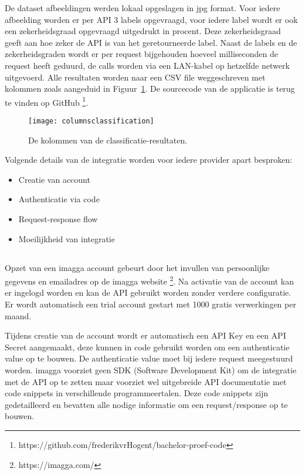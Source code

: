 De dataset afbeeldingen werden lokaal opgeslagen in jpg format. Voor iedere afbeelding worden er per API 3 labels opgevraagd, voor iedere label wordt er ook een zekerheidsgraad opgevraagd uitgedrukt in procent. Deze zekerheidsgraad geeft aan hoe zeker de API is van het geretourneerde label. Naast de labels en de zekerheidsgraden wordt er per request bijgehouden hoeveel milliseconden de request heeft geduurd, de calls worden via een LAN-kabel op hetzelfde netwerk uitgevoerd. Alle resultaten worden naar een CSV file weggeschreven met kolommen zoals aangeduid in Figuur~\ref{fig:columnsclassification}. De sourcecode van de applicatie is terug te vinden op GitHub \footnote{https://github.com/frederikvrHogent/bachelor-proef-code}.

\begin{figure}
    \centering
    \texttt{[image: columnsclassification]}
    \caption{De kolommen van de classificatie-resultaten.}
    \label{fig:columnsclassification}
\end{figure}

Volgende details van de integratie worden voor iedere provider apart besproken:
 \begin{itemize}
    \item Creatie van account
    \item Authenticatie via code
    \item Request-response flow
    \item Moeilijkheid van integratie
\end{itemize}

\subsection{}
\label{sec:integration-imagga}
Opzet van een imagga account gebeurt door het invullen van persoonlijke gegevens en emailadres op de imagga website \footnote{https://imagga.com/}. Na activatie van de account kan er ingelogd worden en kan de API gebruikt worden zonder verdere configuratie. Er wordt automatisch een trial account gestart met 1000 gratis verwerkingen per maand.

Tijdens creatie van de account wordt er automatisch een API Key en een API Secret aangemaakt, deze kunnen in code gebruikt worden om een authenticatie value op te bouwen. De authenticatie value moet bij iedere request meegestuurd worden. imagga voorziet geen SDK (Software Development Kit) om de integratie met de API op te zetten maar voorziet wel uitgebreide API documentatie met code snippets in verschillende programmeertalen. Deze code snippets zijn gedetailleerd en bevatten alle nodige informatie om een request/response op te bouwen.

